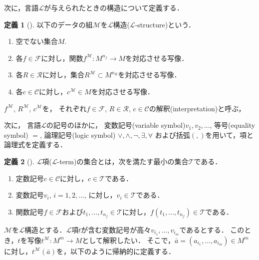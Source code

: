 \documentclass[uplatex, dvipdfmx]{jsarticle}
\numberwithin{equation}{section}
\newcommand{\map}[3]{{#1}\colon{#2}\rightarrow{#3}}
\theoremstyle{definition}
\newtheorem{definition}{定義}[section]
\begin{document}
次に，言語$\mathcal{L}$が与えられたときの構造について定義する．

\begin{definition}[{\cite[Definition 1.1.2]{MR1924282}}]
     以下のデータの組$\mathcal{M}$を$\mathcal{L}$構造($\mathcal{L}$-structure)という．
     \begin{enumerate}
          \item 空でない集合$M$. 
          \item 各$f \in \mathcal{F}$に対し，関数$\map{f^\mathcal{M}}{M^{n_f}}{M}$を対応させる写像．
          \item 各$R \in \mathcal{R}$に対し，集合$R^\mathcal{M} \subset M^{n_R}$を対応させる写像．
          \item 各$c \in \mathcal{C}$に対し，$c^\mathcal{M} \in M$を対応させる写像．
     \end{enumerate}
\end{definition}

$f^\mathcal{M}$, $R^\mathcal{M}$, $c^\mathcal{M}$を，
それぞれ$f \in \mathcal{F}$, $R \in \mathcal{R}$, $c \in \mathcal{C}$の解釈(interpretation)と呼ぶ，

次に，
言語$\mathcal{L}$の記号のほかに，
変数記号(variable symbol)$v_1, v_2, \dots$, 
等号(equality symbol) $=$,
論理記号(logic symbol) $\lor, \land, \lnot, \exists, \forall$
および括弧$(, )$を用いて，項と論理式を定義する．

\begin{definition}[{\cite[Definition 1.1.4]{MR1924282}}]
     $\mathcal{L}$項($\mathcal{L}$-term)の集合とは，次を満たす最小の集合$\mathcal{T}$である．
     \begin{enumerate}
          \item 定数記号$c \in \mathcal{C}$に対し，$c \in \mathcal{T}$である．
          \item 変数記号$v_i$, $i=1, 2, \dots$, に対し，$v_i \in \mathcal{T}$である．
          \item 関数記号$f \in \mathcal{F}$および$t_1, \dots, t_{n_f} \in \mathcal{T}$に対し，$f(t_1, \dots, t_{n_f}) \in \mathcal{T}$である．
     \end{enumerate}
\end{definition}

$\mathcal{M}$を$\mathcal{L}$構造とする．$\mathcal{L}$項$t$が含む変数記号が高々$v_{i_1}, \dots, v_{i_m}$であるとする．
このとき，$t$を写像$\map{t^\mathcal{M}}{M^m}{M}$として解釈したい．
そこで，$\bar{a} = (a_{i_1}, \dots, a_{i_m}) \in M^m$に対し，$t^\mathcal{M}(\bar{a})$を，以下のように帰納的に定義する．
\end{document}
